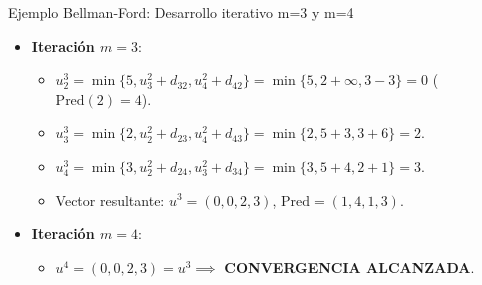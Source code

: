 \documentclass[
  ignorenonframetext,
]{beamer}
\providecommand{\tightlist}{%
  \setlength{\itemsep}{0pt}\setlength{\parskip}{0pt}}
\begin{document}
\begin{frame}{Ejemplo Bellman-Ford: Desarrollo iterativo m=3 y m=4}
\label{ejemplo-bellman-ford-desarrollo-iterativo-m3-y-m4}
\begin{itemize}
\tightlist
\item
  \textbf{Iteración \(m=3\)}:

  \begin{itemize}
  \tightlist
  \item
    \(u_2^3 = \min \{ 5, u_3^2 + d_{32}, u_4^2 + d_{42} \} = \min \{ 5, 2+\infty, 3 - 3 \} = 0\)
    (\(\text{Pred}(2) = 4\)).
  \item
    \(u_3^3 = \min \{ 2, u_2^2 + d_{23}, u_4^2 + d_{43} \} = \min \{ 2, 5+3, 3+6 \} = 2\).
  \item
    \(u_4^3 = \min \{ 3, u_2^2 + d_{24}, u_3^2 + d_{34} \} = \min \{ 3, 5+4, 2+1 \} = 3\).
  \item
    Vector resultante: \(u^3 = (0, 0, 2, 3)\),
    \(\text{Pred} = (1, 4, 1, 3)\).
  \end{itemize}
\item
  \textbf{Iteración \(m=4\)}:

  \begin{itemize}
  \tightlist
  \item
    \(u^4 = (0, 0, 2, 3) = u^3 \implies\) \textbf{CONVERGENCIA
    ALCANZADA}.
  \end{itemize}
\end{itemize}
\end{frame}
\end{document}
